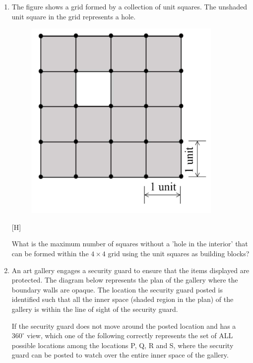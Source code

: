 \documentclass[12pt,a4paper]{article}
\begin{document}
\begin{enumerate}
   \item The figure shows a grid formed by a collection of unit squares. The unshaded unit square in the grid represents a hole.

         \begin{figure}[H]
            \centering
            \includegraphics[scale=0.5]{q4}
            \label{fig:q4}
         \end{figure}[H]

         What is the maximum number of squares without a 'hole in the interior' that can be formed within the $4 \times 4$ grid using the unit squares as building blocks?
         \begin{enumerate}
         \end{enumerate}

   \item An art gallery engages a security guard to ensure that the items displayed are protected. The diagram below represents the plan of the gallery where the boundary walls are opaque. The location the security guard posted is identified such that all the inner space (shaded region in the plan) of the gallery is within the line of sight of the security guard.

         If the security guard does not move around the posted location and has a $360^\circ$ view, which one of the following correctly represents the set of ALL possible locations among the locations P, Q, R and S, where the security guard can be posted to watch over the entire inner space of the gallery.


\end{enumerate}
\end{document}
